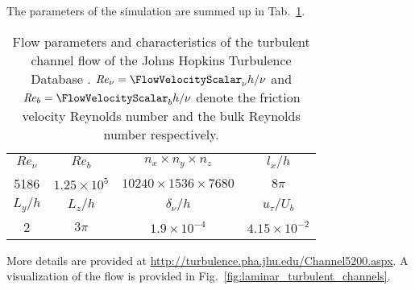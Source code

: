 The parameters of the simulation are summed up in Tab.~\ref{tab:jhtdb_channel_simulation_parameters}.
\begin{table}
	\center
	\begin{tabular}{c c c c}
		\rowcolor{ColorTabularParameters}
		$\mathit{Re}_{\nu}$ & $\mathit{Re}_b$ & $n_x \times n_y \times n_z$ & $l_x/h$ \\[4pt]
		\rowcolor{ColorTabularValues}
		5186 & $1.25\times10^{5}$ & $10240 \times 1536 \times 7680$ & $8\pi$ \\[4pt]
		\rowcolor{ColorTabularParameters}
		$L_y/h$ & $L_z/h$ & $\delta_{\nu}/h$ & $u_{\tau}/U_b$ \\[4pt]
		\rowcolor{ColorTabularValues}
		2 & $3\pi$ & $1.9\times10^{-4}$ & $4.15\times10^{-2}$
	\end{tabular}
	\caption{
		Flow parameters and characteristics of the turbulent channel flow of the Johns Hopkins Turbulence Database \citep{li2008public, perlman2007data}.
		$\mathit{Re}_{\nu} = \FlowVelocityScalar_{\nu} h / \nu$ and $\mathit{Re}_{b} = \FlowVelocityScalar_{b} h / \nu$ denote the friction velocity Reynolds number and the bulk Reynolds number respectively.
	}
	\label{tab:jhtdb_channel_simulation_parameters}
\end{table}
More details are provided at \url{http://turbulence.pha.jhu.edu/Channel5200.aspx}.
A visualization of the flow is provided in Fig.~\ref{fig:laminar_turbulent_channels}.

